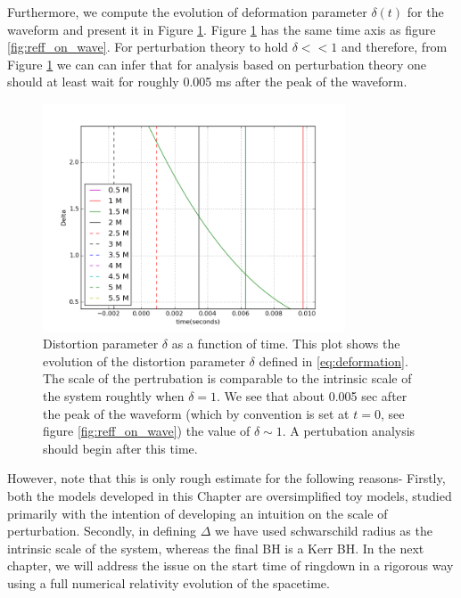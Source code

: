 Furthermore, we compute the evolution of deformation parameter $\delta (t)$ for the waveform and present it in Figure \ref{fig:delta}. Figure \ref{fig:delta} has the same time axis as figure \ref{fig:reff_on_wave}. For perturbation theory to hold $\delta << 1$ and therefore, from Figure \ref{fig:delta} we can can infer that for analysis based on perturbation theory one should at least wait for roughly 0.005 ms after the peak of the waveform.  

\begin{figure}
\centering
\includegraphics[width=0.8\textwidth]{figures/Delta_of_t.png}
\caption{Distortion parameter $\delta$ as a function of time. This plot shows the evolution of the distortion parameter $\delta$ defined in \ref{eq:deformation}. The scale of the pertrubation is comparable to the intrinsic scale of the system roughtly when $\delta =1 $. We see that about 0.005 sec after the peak of the waveform (which by convention is set at $t=0$, see figure \ref{fig:reff_on_wave}) the value of $\delta \sim 1$. A pertubation analysis should begin after this time.}
\label{fig:delta}
\end{figure}

However, note that this is only rough estimate for the following reasons- Firstly, both the models developed in this Chapter are oversimplified toy models, studied primarily with the intention of developing an intuition on the scale of perturbation. Secondly, in defining $\Delta$ we have used schwarschild radius as the intrinsic scale of the system, whereas the final BH is a Kerr BH. In the next chapter, we will address the issue on the start time of ringdown in a rigorous way using a full numerical relativity evolution of the spacetime. 


